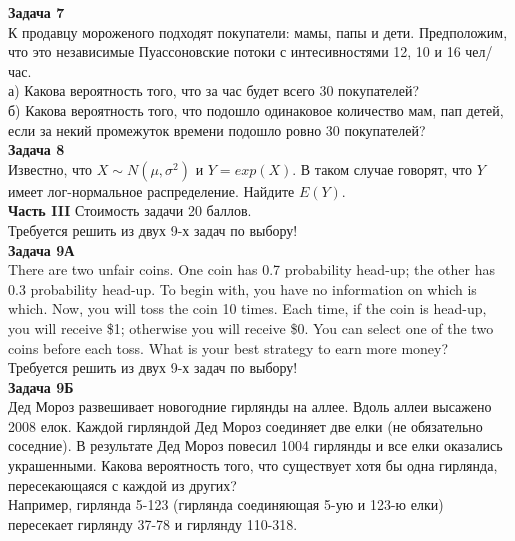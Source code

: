 \documentclass[pdftex,12pt,a4paper]{article}
\begin{document}


\textbf{Задача 7} \\
К продавцу мороженого подходят покупатели: мамы, папы и дети. Предположим, что это независимые Пуассоновские потоки с интесивностями 12, 10 и 16 чел/час. \\
а) Какова вероятность того, что за час будет всего 30 покупателей? \\
б) Какова вероятность того, что подошло одинаковое количество мам, пап детей, если за некий промежуток времени подошло ровно 30 покупателей? \\


\textbf{Задача 8} \\ %
Известно, что $X\sim N(\mu,\sigma^{2})$ и $Y=exp(X)$. В таком случае говорят, что $Y$ имеет лог-нормальное распределение. Найдите $E(Y)$. \\



\textbf{Часть III} Стоимость задачи 20 баллов. \\

Требуется решить \textbf{} из двух 9-х задач по
выбору! \\


\textbf{Задача 9А} \\
There are two unfair coins. One coin has 0.7 probability head-up; the other has 0.3 probability head-up. To begin with, you have no information on which is which. Now, you will toss the coin 10 times. Each time, if the coin is head-up, you will receive \$1; otherwise you will receive \$0. You can select one of the two coins before each toss. What is your best strategy to earn more money? \\



Требуется решить \textbf{} из двух 9-х задач по
выбору! \\



\textbf{Задача 9Б} \\
Дед Мороз развешивает новогодние гирлянды на аллее. Вдоль аллеи высажено 2008 елок. Каждой гирляндой Дед Мороз соединяет две елки (не обязательно соседние). В результате Дед Мороз повесил 1004 гирлянды и все елки оказались украшенными. Какова вероятность того, что существует хотя бы одна гирлянда, пересекающаяся с каждой из других? \\
Например, гирлянда 5-123 (гирлянда соединяющая 5-ую и 123-ю елки) пересекает гирлянду 37-78 и гирлянду 110-318.
\end{document}
